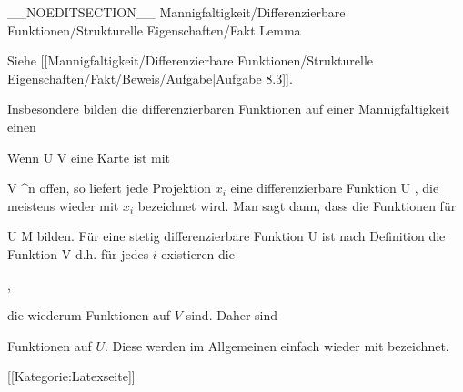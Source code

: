 __NOEDITSECTION__
{Mannigfaltigkeit/Differenzierbare Funktionen/Strukturelle Eigenschaften/Fakt}
{Lemma}
{}
{

\faktzusatz {}
\faktzusatz {}

 }
{ Siehe [[Mannigfaltigkeit/Differenzierbare Funktionen/Strukturelle Eigenschaften/Fakt/Beweis/Aufgabe|Aufgabe 8.3]]. }

Insbesondere bilden die differenzierbaren Funktionen auf einer Mannigfaltigkeit einen

Wenn
\maabbdisp {\alpha} {U} {V
} {}
eine Karte ist mit

\mavergleichskette
{\vergleichskette
{ V
}
{ \subseteq }{ \R^n
}
{  }{
}
{    }{
}
{   }{
}
}
{}{}{}
offen, so liefert jede Projektion $x_i$ eine differenzierbare Funktion
 {U} {\R
} {,}
die meistens wieder mit $x_i$ bezeichnet wird. Man sagt dann, dass die Funktionen
  {} für

\mavergleichskette
{\vergleichskette
{ U
}
{ \subseteq }{ M
}
{  }{
}
{    }{
}
{   }{
}
}
{}{}{}
bilden. Für eine stetig differenzierbare Funktion
 {U} {\R
} {}
ist nach Definition die Funktion
 {V} {\R
} {}
d.h. für jedes $i$ existieren die

 { , }

die wiederum
 {} {}
Funktionen auf $V$ sind. Daher sind

 {  }

Funktionen auf $U$. Diese werden im Allgemeinen einfach wieder mit
 bezeichnet.

 [[Kategorie:Latexseite]]
